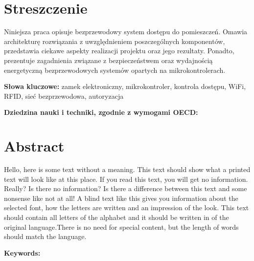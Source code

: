 \section*{Streszczenie}
Niniejsza praca opisuje bezprzewodowy system dostępu do pomieszczeń. Omawia
architekturę rozwiązania z uwzględnieniem poszczególnych komponentów, przedstawia
ciekawe aspekty realizacji projektu oraz jego rezultaty. Ponadto, prezentuje
zagadnienia związane z bezpieczeństwem oraz wydajnością energetyczną bezprzewodowych systemów opartych na
mikrokontrolerach.

\textbf{Słowa kluczowe:} zamek elektroniczny, mikrokontroler, kontrola dostępu, WiFi, RFID, sieć bezprzewodowa, autoryzacja

\textbf{Dziedzina nauki i techniki, zgodnie z wymogami OECD:}

\section*{Abstract}
Hello, here is some text without a meaning.  This text should show what
a printed text will look like at this place.  If you read this text,
you will get no information.  Really?  Is there no information?  Is there
a difference between this text and some nonsense like not at all!  A
blind text like this gives you information about the selected font, how
the letters are written and an impression of the look.  This text should
contain all letters of the alphabet and it should be written in of the
original language.There is no need for special content, but the length of
words should match the language.

\textbf{Keywords:}
